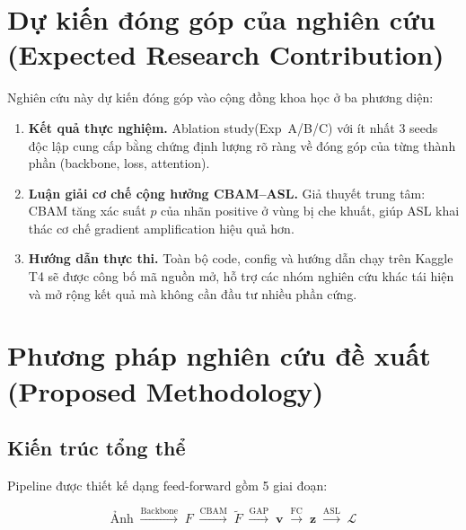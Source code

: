 \documentclass{article}
\begin{document}
\section{Dự kiến đóng góp của nghiên cứu\\(Expected Research Contribution)}

Nghiên cứu này dự kiến đóng góp vào cộng đồng khoa học ở ba phương diện:

\begin{enumerate}[leftmargin=2em]
  \item \textbf{Kết quả thực nghiệm.}
        Ablation study(Exp~A/B/C) với ít nhất 3 seeds độc lập cung
        cấp bằng chứng định lượng rõ ràng về đóng góp của từng thành phần
        (backbone, loss, attention).

  \item \textbf{Luận giải cơ chế cộng hưởng CBAM--ASL.}
        Giả thuyết trung tâm: CBAM tăng xác suất $p$ của nhãn positive ở vùng bị che khuất, giúp ASL khai thác cơ chế gradient amplification hiệu quả hơn. 

  \item \textbf{Hướng dẫn thực thi.}
        Toàn bộ code, config và hướng dẫn chạy trên Kaggle T4 sẽ được công bố
        mã nguồn mở, hỗ trợ các nhóm nghiên cứu khác tái hiện và mở rộng
        kết quả mà không cần đầu tư nhiều phần cứng.
\end{enumerate}

\section{Phương pháp nghiên cứu đề xuất (Proposed Methodology)}

\subsection{Kiến trúc tổng thể}

Pipeline được thiết kế dạng feed-forward gồm 5 giai đoạn:

\begin{equation}
  \text{Ảnh} \;\xrightarrow{\text{Backbone}}\; F \;\xrightarrow{\text{CBAM}}\;
  \tilde{F} \;\xrightarrow{\text{GAP}}\; \mathbf{v}
  \;\xrightarrow{\text{FC}}\; \mathbf{z} \;\xrightarrow{\text{ASL}}\; \mathcal{L}
  \label{eq:pipeline}
\end{equation}
\end{document}
